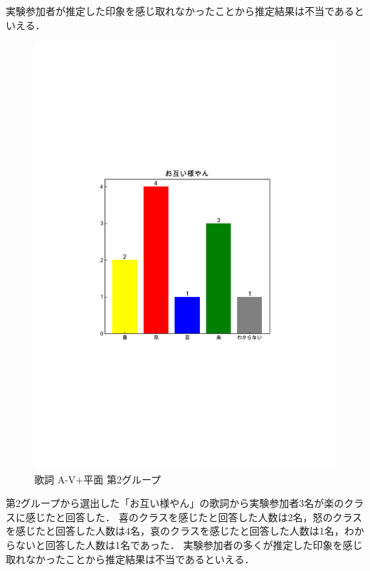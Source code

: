 実験参加者が推定した印象を感じ取れなかったことから推定結果は不当であるといえる．
\newpage
\begin{figure}[H]
    \centering
    \includegraphics[width=14cm]{4323.pdf}
    \vspace{-1mm}
    \caption{歌詞 A-V+平面 第2グループ}
    \label{fig:mms}
    \vspace{5mm}
\end{figure}
第2グループから選出した「お互い様やん」の歌詞から実験参加者3名が楽のクラスに感じたと回答した．
喜のクラスを感じたと回答した人数は2名，怒のクラスを感じたと回答した人数は4名，哀のクラスを感じたと回答した人数は1名，わからないと回答した人数は1名であった．
実験参加者の多くが推定した印象を感じ取れなかったことから推定結果は不当であるといえる．
\newpage
